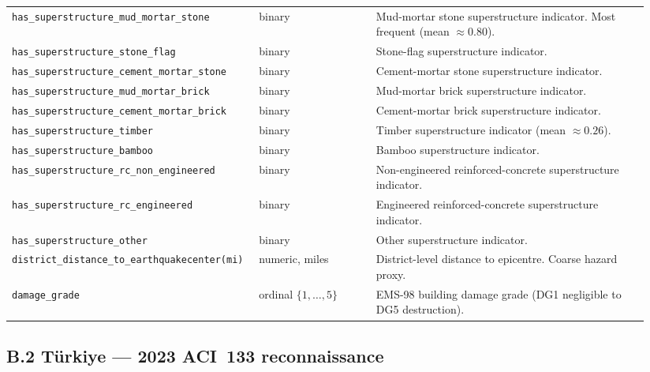 \documentclass[11pt,a4paper]{article}
\begin{document}
\begin{longtable}{
>{\scriptsize\ttfamily\RaggedRight\arraybackslash}p{0.34\linewidth}
p{0.18\linewidth}
p{0.42\linewidth}
}
\texttt{has\_superstructure\_mud\_mortar\_stone} & binary                & Mud-mortar stone superstructure indicator. Most frequent (mean $\approx 0.80$). \\
\texttt{has\_superstructure\_stone\_flag}      & binary                  & Stone-flag superstructure indicator. \\
\texttt{has\_superstructure\_cement\_mortar\_stone} & binary             & Cement-mortar stone superstructure indicator. \\
\texttt{has\_superstructure\_mud\_mortar\_brick} & binary                & Mud-mortar brick superstructure indicator. \\
\texttt{has\_superstructure\_cement\_mortar\_brick} & binary             & Cement-mortar brick superstructure indicator. \\
\texttt{has\_superstructure\_timber}           & binary                  & Timber superstructure indicator (mean $\approx 0.26$). \\
\texttt{has\_superstructure\_bamboo}           & binary                  & Bamboo superstructure indicator. \\
\texttt{has\_superstructure\_rc\_non\_engineered} & binary               & Non-engineered reinforced-concrete superstructure indicator. \\
\texttt{has\_superstructure\_rc\_engineered}   & binary                  & Engineered reinforced-concrete superstructure indicator. \\
\texttt{has\_superstructure\_other}            & binary                  & Other superstructure indicator. \\
\texttt{district\_distance\_to\_earthquakecenter(mi)} & numeric, miles   & District-level distance to epicentre. Coarse hazard proxy. \\
\texttt{damage\_grade}                         & ordinal $\{1,\dots,5\}$ & EMS-98 building damage grade (DG1 negligible to DG5 destruction). \\
\bottomrule
\end{longtable}

\subsection*{B.2 \quad T\"urkiye --- 2023 ACI~133 reconnaissance}
\end{document}
